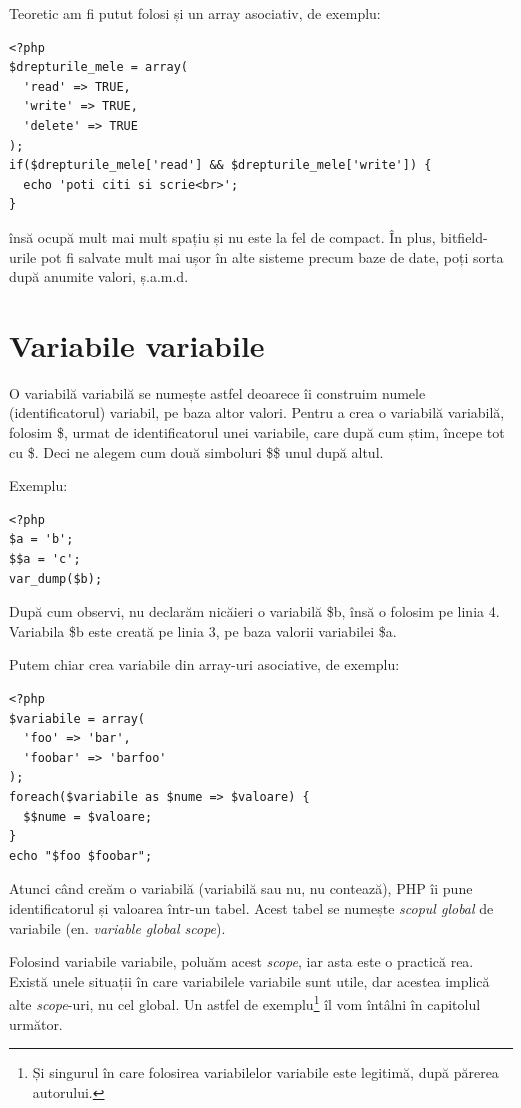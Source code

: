 Teoretic am fi putut folosi și un array asociativ, de exemplu:
\begin{lstlisting}
<?php
$drepturile_mele = array(
  'read' => TRUE,
  'write' => TRUE,
  'delete' => TRUE
);
if($drepturile_mele['read'] && $drepturile_mele['write']) {
  echo 'poti citi si scrie<br>';
}
\end{lstlisting}
însă ocupă mult mai mult spațiu și nu este la fel de compact.
În plus, bitfield-urile pot fi salvate mult mai ușor în alte
sisteme precum baze de date, poți sorta după anumite valori, ș.a.m.d.

\section{Variabile variabile}
O variabilă variabilă se numește astfel deoarece îi construim numele (identificatorul) variabil,
pe baza altor valori. Pentru a crea o variabilă variabilă, folosim \$, urmat de identificatorul unei variabile,
care după cum știm, începe tot cu \$. Deci ne alegem cum două simboluri \$\$ unul după altul.

Exemplu:
\begin{lstlisting}
<?php
$a = 'b';
$$a = 'c';
var_dump($b);
\end{lstlisting}
După cum observi, nu declarăm nicăieri o variabilă \$b, însă o folosim pe linia 4.
Variabila \$b este creată pe linia 3, pe baza valorii variabilei \$a.

Putem chiar crea variabile din array-uri asociative, de exemplu:
\begin{lstlisting}[label=lst:varvarfromassoc,caption=Variabile variabile din array asociativ]
<?php
$variabile = array(
  'foo' => 'bar',
  'foobar' => 'barfoo'
);
foreach($variabile as $nume => $valoare) {
  $$nume = $valoare;
}
echo "$foo $foobar";
\end{lstlisting}

Atunci când creăm o variabilă (variabilă sau nu, nu contează), PHP îi pune identificatorul și valoarea
într-un tabel. Acest tabel se numește \textsl{scopul global} de variabile (en. \textsl{variable global scope}).

Folosind variabile variabile, poluăm acest \textit{scope}, iar asta este o practică rea.
Există unele situații în care variabilele variabile sunt utile, dar acestea implică
alte \textit{scope}-uri, nu cel global. Un astfel de exemplu\footnote{Și singurul în care
folosirea variabilelor variabile este legitimă, după părerea autorului.} îl vom întâlni
în capitolul următor.

